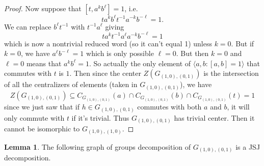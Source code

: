 \documentclass[10pt]{article}
\def\subs{\subseteq}
\theoremstyle{definition}
\newtheorem{lemma}{Lemma}
\begin{document}
\begin{proof}
Now suppose that $[t, a^k b^\ell]=1$, i.e. 
$$t a^k b^\ell t^{-1} a^{-k} b^{-\ell}=1.$$ We can replace $b^\ell t^{-1}$ with $t^{-1}a^\ell$ giving
$$t a^k t^{-1} a^\ell  a^{-k} b^{-\ell}=1$$
which is now a nontrivial reduced word (so it can't equal 1) unless $k=0$. But if $k=0$, we have $a^\ell b^{-\ell} =1$ which is only possible $\ell = 0$. But then $k=0$ and $\ell=0$ means that $a^kb^\ell = 1$. So actually the only element of $\langle a,b:[a,b]=1\rangle$ that commutes with $t$ is $1$. Then since the center $Z(G_{(1,0),(0,1)})$ is the intersection of all the centralizers of elements (taken in $G_{(1,0),(0,1)}$), we have $$Z(G_{(1,0),(0,1)}) \subs C_{G_{(1,0),(0,1)}}(a) \cap C_{G_{(1,0),(0,1)}}(b) \cap C_{G_{(1,0),(0,1)}}(t) = 1$$
since we just saw that if $h\in G_{(1,0),(0,1)}$ commutes with both $a$ and $b$, it will only commute with $t$ if it's trivial. Thus $G_{(1,0),(0,1)}$ has trivial center. Then it cannot be isomorphic to $G_{(1,0),(1,0)}$. 
\end{proof}



\begin{lemma}\label{G_10,01 JSJ}
    The following graph of groups decomposition of $G_{(1,0),(0,1)}$ is a JSJ decomposition. 
\begin{center}
\end{center}
\end{lemma}
\end{document}
